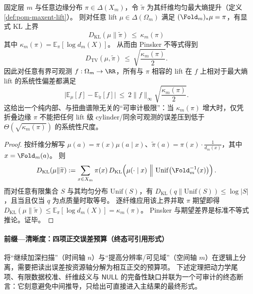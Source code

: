 \begin{theorem}\label{thm:defect-limited-audit}
固定层 \(m\) 与任意边缘分布 \(\pi\in\Delta(X_m)\)，令 \(\widetilde\pi\) 为其纤维均匀最大熵提升（定义 \ref{def:pom-maxent-lift}）。
则对任意 lift \(\mu\in\Delta(\Omega_m)\) 满足 \((\Fold_m)_*\mu=\pi\)，有显式 KL 上界
\[
\boxed{\;
D_{\mathrm{KL}}(\mu\|\widetilde\pi)\ \le\ \kappa_m(\pi)
\;}
\]
其中 \(\kappa_m(\pi)=\mathbb{E}_\pi[\log d_m(X)]\)。
从而由 Pinsker 不等式得到
\[
\boxed{\;
D_{\mathrm{TV}}(\mu,\widetilde\pi)\ \le\ \sqrt{\frac{\kappa_m(\pi)}{2}}.
\;}
\]
因此对任意有界可观测 \(f:\Omega_m\to\RR\)，所有与 \(\pi\) 相容的 lift 在 \(f\) 上相对于最大熵 lift 的系统性偏差都满足
\[
\boxed{\;
\bigl|\mathbb{E}_\mu[f]-\mathbb{E}_{\widetilde\pi}[f]\bigr|
\ \le\ 2\|f\|_\infty\sqrt{\frac{\kappa_m(\pi)}{2}}.
\;}
\]
这给出一个纯内部、与扭曲谱隙无关的“可审计极限”：当 \(\kappa_m(\pi)\) 增大时，仅凭折叠边缘 \(\pi\) 不能把任何 lift 级 cylinder/同余可观测的误差压到低于 \(\Theta(\sqrt{\kappa_m(\pi)})\) 的系统性尺度。
\end{theorem}

\begin{proof}
按纤维分解写 \(\mu(a)=\pi(x)\mu(a\mid x)\)、\(\widetilde\pi(a)=\pi(x)\cdot \frac{1}{d_m(x)}\)，其中 \(x=\Fold_m(a)\)。
则
\[
D_{\mathrm{KL}}(\mu\|\widetilde\pi)
:=\sum_{x\in X_m}\pi(x)\,D_{\mathrm{KL}}\!\left(\mu(\cdot\mid x)\ \Big\|\ \mathrm{Unif}\big(\Fold_m^{-1}(x)\big)\right).
\]
而对任意有限集合 \(S\) 与其均匀分布 \(\mathrm{Unif}(S)\)，有 \(D_{\mathrm{KL}}(q\|\mathrm{Unif}(S))\le \log|S|\)，且当且仅当 \(q\) 为点质量时取等号。
逐纤维应用该上界并取 \(\pi\) 期望即得 \(D_{\mathrm{KL}}(\mu\|\widetilde\pi)\le \mathbb{E}_\pi[\log d_m(X)]=\kappa_m(\pi)\)。
Pinsker 与期望差界是标准不等式推论。证毕。
\end{proof}



\paragraph{前缀—清晰度：四项正交误差预算（终态可引用形式）}
将“继续加深扫描”（时间轴 \(n\)）与“提高分辨率/可见域”（空间轴 \(m\)）在逻辑上分离，需要把读出误差按资源轴分解为相互正交的预算项。
下述定理把动力学尾项、有限数据校准、纤维歧义与 \(\mathsf{NULL}\) 的完备性缺口并联为一个可审计的终态断言：它刻意避免中间推导，只给出可直接进入主结果的最终形式。

